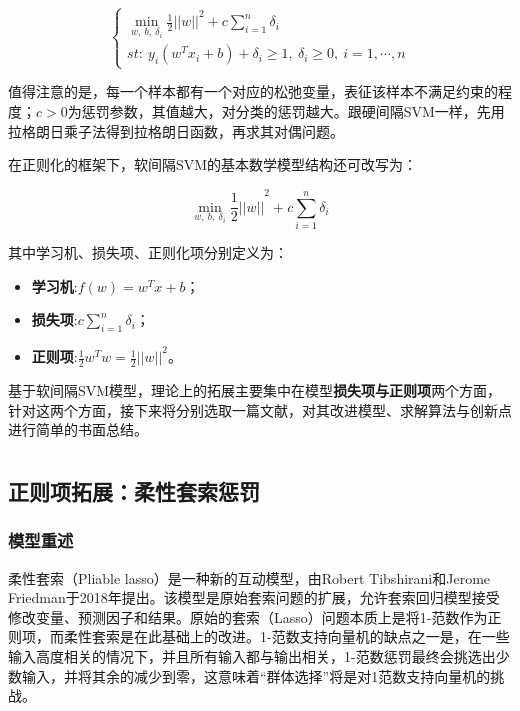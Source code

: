 \documentclass[12pt]{article}  %
\newcommand{\upcite}[1]{\textsuperscript{\textsuperscript{\cite{#1}}}}
\begin{document}
\begin{equation}
	\begin{cases}
		\mathop{min}\limits_{w,\ b,\ \delta_i} {{\frac{1}{2}||w||}^2+c\sum_{i=1}^{n}\delta_i}         \\                                           
		st:\ y_i(w^Tx_i+b)+\delta_i\geq1,\ \delta_i\geq0,\ i=1,\cdots,n
	\end{cases}                               
\end{equation}

值得注意的是，每一个样本都有一个对应的松弛变量，表征该样本不满足约束的程度；$c>0$为惩罚参数，其值越大，对分类的惩罚越大。跟硬间隔SVM一样，先用拉格朗日乘子法得到拉格朗日函数，再求其对偶问题。

在正则化的框架下，软间隔SVM的基本数学模型结构还可改写为：

\begin{equation}
	\mathop{min}\limits_{w,\ b,\ \delta_i} {{\frac{1}{2}||w||}^2+c\sum_{i=1}^{n}\delta_i}                          
\end{equation}

其中学习机、损失项、正则化项分别定义为：

\begin{itemize}
	\setlength{\parsep}{0ex} %
	\setlength{\topsep}{2ex} %
	\setlength{\itemsep}{1ex} %
	\item \textbf{学习机}:$f\left(w\right)=w^Tx+b$；		
	\item \textbf{损失项}:$c\sum_{i=1}^{n}\delta_i$；
	\item \textbf{正则项}:$\frac{1}{2}w^Tw={\frac{1}{2}||w||}^2$。
\end{itemize}

基于软间隔SVM模型，理论上的拓展主要集中在模型\textbf{损失项与正则项}两个方面，针对这两个方面，接下来将分别选取一篇文献，对其改进模型、求解算法与创新点进行简单的书面总结。

\subsection{正则项拓展：柔性套索惩罚\upcite{2}}
\subsubsection{模型重述}

柔性套索（Pliable lasso）是一种新的互动模型，由Robert Tibshirani和Jerome Friedman于2018年提出。该模型是原始套索问题的扩展，允许套索回归模型接受修改变量、预测因子和结果。原始的套索（Lasso）问题本质上是将1-范数作为正则项，而柔性套索是在此基础上的改进。1-范数支持向量机的缺点之一是，在一些输入高度相关的情况下，并且所有输入都与输出相关，1-范数惩罚最终会挑选出少数输入，并将其余的减少到零，这意味着“群体选择”将是对1范数支持向量机的挑战。
\end{document}

